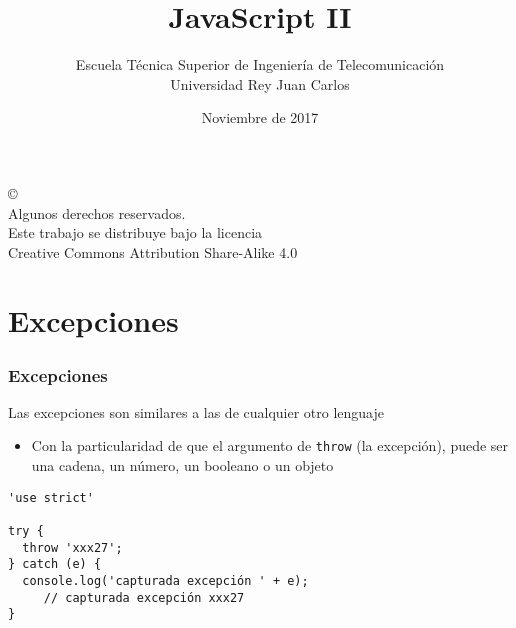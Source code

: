 \documentclass[ucs]{beamer}
\begin{document}
\title[JavaScript II]{JavaScript II}
\author[GSyC]{Escuela Técnica Superior de Ingeniería de Telecomunicación\\
Universidad Rey Juan Carlos}
\date[2017]{Noviembre de 2017}


\begin{frame}
  \titlepage
\end{frame}




\begin{frame}[b]
\begin{flushright}
{\tiny
\copyright \insertshortdate~\insertshortauthor \\
  Algunos derechos reservados. \\
  Este trabajo se distribuye bajo la licencia \\
  Creative Commons Attribution Share-Alike 4.0
}
\end{flushright}
\end{frame}




%

\section{Excepciones}
\begin{frame}[fragile]
\frametitle{Excepciones}
Las excepciones son similares a las de cualquier otro lenguaje
\begin{itemize}
\item
Con la particularidad de que el argumento de \verb|throw| (la excepción), 
puede ser una cadena, un número, un booleano o un objeto
\end{itemize}

  \begin{scriptsize}
  \begin{verbatim}
'use strict'

try {
  throw 'xxx27';
} catch (e) {
  console.log('capturada excepción ' + e);
     // capturada excepción xxx27
}
  \end{verbatim}
  \end{scriptsize}

\end{frame}
\end{document}
